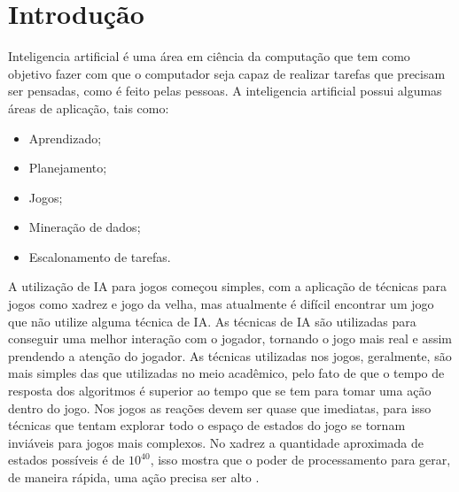 \chapter{\label{chap:intro}Introdução}



Inteligencia artificial é uma área em ciência da computação que tem como objetivo fazer com que o computador seja capaz de realizar tarefas que precisam ser pensadas, como é feito pelas pessoas.  
A inteligencia artificial possui algumas áreas de aplicação, tais como: %
\begin{itemize}
	\item Aprendizado;
	\item Planejamento;
	\item Jogos;
	\item Mineração de dados;
	\item Escalonamento de tarefas.
\end{itemize}


A utilização de IA para jogos começou simples, com a aplicação de técnicas para jogos como xadrez e jogo da velha, mas atualmente é difícil encontrar um jogo que não utilize alguma técnica de IA. As técnicas de IA são utilizadas para conseguir uma melhor interação com o jogador, tornando o jogo mais real e assim prendendo a atenção do jogador. As técnicas utilizadas nos jogos, geralmente, são mais simples das que utilizadas no meio acadêmico, pelo fato de que o tempo de resposta dos algoritmos é superior ao tempo que se tem para tomar uma ação dentro do jogo. Nos jogos as reações devem ser quase que imediatas, para isso técnicas que tentam explorar todo o espaço de estados do jogo se tornam inviáveis para jogos mais complexos. No xadrez a quantidade aproximada de estados possíveis é de $10^{40}$, isso mostra que o poder de processamento para gerar, de maneira rápida, uma ação precisa ser alto \cite{millington2009artificial}. \\



